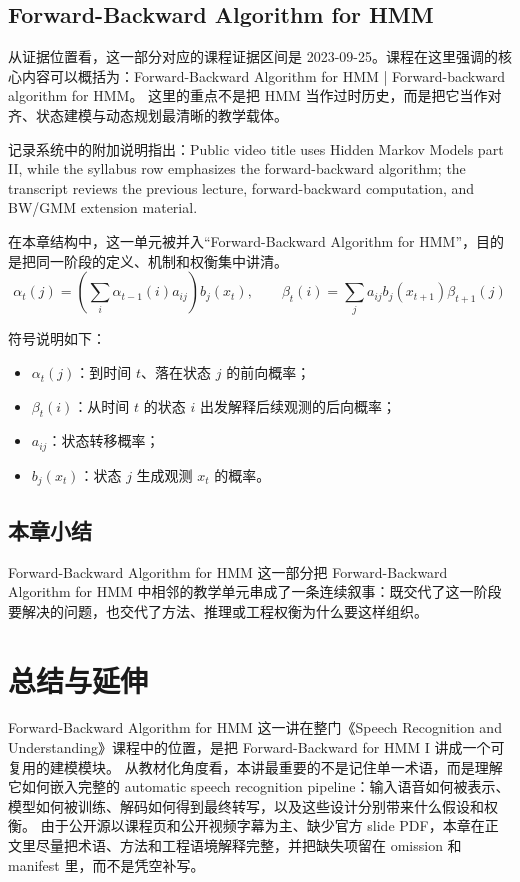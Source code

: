 \documentclass[a4paper]{article}
\begin{document}
\subsection{Forward-Backward Algorithm for HMM}
从证据位置看，这一部分对应的课程证据区间是 2023-09-25。课程在这里强调的核心内容可以概括为：Forward-Backward Algorithm for HMM | Forward-backward algorithm for HMM。
这里的重点不是把 HMM 当作过时历史，而是把它当作对齐、状态建模与动态规划最清晰的教学载体。

记录系统中的附加说明指出：Public video title uses Hidden Markov Models part II, while the syllabus row emphasizes the forward-backward algorithm; the transcript reviews the previous lecture, forward-backward computation, and BW/GMM extension material.

在本章结构中，这一单元被并入“Forward-Backward Algorithm for HMM”，目的是把同一阶段的定义、机制和权衡集中讲清。
\[
\alpha_t(j) = \left( \sum_i \alpha_{t-1}(i) a_{ij} \right) b_j(x_t), \qquad
\beta_t(i) = \sum_j a_{ij} b_j(x_{t+1}) \beta_{t+1}(j)
\]

符号说明如下：
\begin{itemize}
\item $\alpha_t(j)$：到时间 $t$、落在状态 $j$ 的前向概率；
\item $\beta_t(i)$：从时间 $t$ 的状态 $i$ 出发解释后续观测的后向概率；
\item $a_{ij}$：状态转移概率；
\item $b_j(x_t)$：状态 $j$ 生成观测 $x_t$ 的概率。
\end{itemize}

\subsection{本章小结}
Forward-Backward Algorithm for HMM 这一部分把 Forward-Backward Algorithm for HMM 中相邻的教学单元串成了一条连续叙事：既交代了这一阶段要解决的问题，也交代了方法、推理或工程权衡为什么要这样组织。

\section{总结与延伸}
Forward-Backward Algorithm for HMM 这一讲在整门《Speech Recognition and Understanding》课程中的位置，是把 Forward-Backward for HMM I 讲成一个可复用的建模模块。
从教材化角度看，本讲最重要的不是记住单一术语，而是理解它如何嵌入完整的 automatic speech recognition pipeline：输入语音如何被表示、模型如何被训练、解码如何得到最终转写，以及这些设计分别带来什么假设和权衡。
由于公开源以课程页和公开视频字幕为主、缺少官方 slide PDF，本章在正文里尽量把术语、方法和工程语境解释完整，并把缺失项留在 omission 和 manifest 里，而不是凭空补写。
\end{document}
